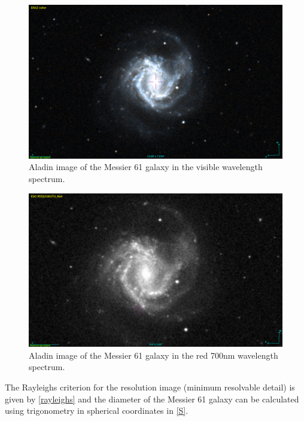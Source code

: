 \documentclass[12pt]{article}
\begin{document}
\begin{multicols}{2}
\begin{figure}[H]
\centering
\includegraphics[scale=0.22]{Images/As_Images/M61.png}
\caption{Aladin image of the Messier 61 galaxy in the visible wavelength spectrum.}
\label{Aladin image of the Orion Nebula}
\end{figure}

\begin{figure}[H]
\centering
\includegraphics[scale=0.22]{Images/As_Images/M61Red.png}
\caption{Aladin image of the Messier 61 galaxy in the red 700nm wavelength spectrum.}
\label{Aladin Red image of the Orion Nebula}
\end{figure}
\end{multicols}
\vspace{0.2cm}

The Rayleighs criterion for the resolution image (minimum resolvable detail) is given by \cref{rayleighs} and the diameter of the Messier 61 galaxy can be calculated using trigonometry in spherical coordinates in \cref{S}. \\
\end{document}
